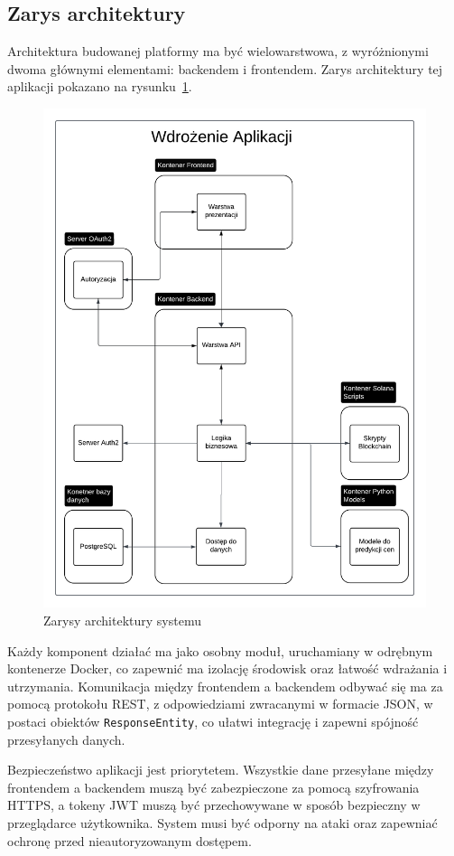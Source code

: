 \subsection{Zarys architektury}\label{subsec:ZarysArchitektury}
Architektura budowanej platformy ma być wielowarstwowa, z wyróżnionymi dwoma głównymi elementami: backendem i frontendem. 
Zarys architektury tej aplikacji pokazano na rysunku~\ref{fig:ZarysyArchitekturySystemu}.
\begin{figure}[htb]
    \centering
    \includegraphics[width=0.9\linewidth]{Diagram.png}
    \caption{Zarysy architektury systemu}
    \label{fig:ZarysyArchitekturySystemu}
\end{figure}
Każdy komponent działać ma jako osobny moduł, uruchamiany w odrębnym kontenerze Docker, co zapewnić ma izolację środowisk oraz łatwość wdrażania i utrzymania. Komunikacja między frontendem a backendem odbywać się ma za pomocą protokołu REST, z odpowiedziami zwracanymi w formacie JSON, w postaci obiektów \texttt{ResponseEntity}, co ułatwi integrację i zapewni spójność przesyłanych danych.

Bezpieczeństwo aplikacji jest priorytetem. Wszystkie dane przesyłane między frontendem a backendem muszą być zabezpieczone za pomocą szyfrowania HTTPS, a tokeny JWT muszą być przechowywane w sposób bezpieczny w przeglądarce użytkownika. System musi być odporny na ataki oraz zapewniać ochronę przed nieautoryzowanym dostępem.


